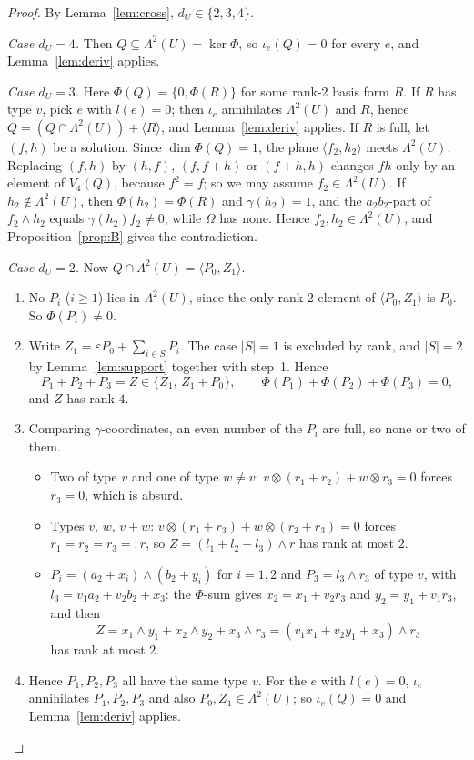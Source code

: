 \documentclass[11pt,a4paper]{article}
\theoremstyle{plain}
\theoremstyle{definition}
\theoremstyle{remark}
\newcommand{\Lam}{\Lambda^{2}}
\newcommand{\dU}{d_U}
\begin{document}
\begin{proof}
By Lemma~\ref{lem:cross}, $\dU\in\{2,3,4\}$.

\medskip\noindent\emph{Case $\dU=4$.} Then $Q\subseteq\Lam(U)=\ker\Phi$, so $\iota_e(Q)=0$ for every $e$, and Lemma~\ref{lem:deriv} applies.

\medskip\noindent\emph{Case $\dU=3$.} Here $\Phi(Q)=\{0,\Phi(R)\}$ for some rank-2 basis form $R$.
If $R$ has type $v$, pick $e$ with $l(e)=0$; then $\iota_e$ annihilates $\Lam(U)$ and $R$, hence $Q=(Q\cap\Lam(U))+\langle R\rangle$, and Lemma~\ref{lem:deriv} applies.
If $R$ is full, let $(f,h)$ be a solution. Since $\dim\Phi(Q)=1$, the plane $\langle f_2,h_2\rangle$ meets $\Lam(U)$. Replacing $(f,h)$ by $(h,f)$, $(f,f+h)$ or $(f+h,h)$ changes $fh$ only by an element of $V_4(Q)$, because $f^2=f$; so we may assume $f_2\in\Lam(U)$. If $h_2\notin\Lam(U)$, then $\Phi(h_2)=\Phi(R)$ and $\gamma(h_2)=1$, and the $a_2b_2$-part of $f_2\wedge h_2$ equals $\gamma(h_2)f_2\neq0$, while $\Omega$ has none. Hence $f_2,h_2\in\Lam(U)$, and Proposition~\ref{prop:B} gives the contradiction.

\medskip\noindent\emph{Case $\dU=2$.} Now $Q\cap\Lam(U)=\langle P_0,Z_1\rangle$.
\begin{enumerate}[1.]
  \item No $P_i$ ($i\ge1$) lies in $\Lam(U)$, since the only rank-2 element of $\langle P_0,Z_1\rangle$ is $P_0$. So $\Phi(P_i)\neq0$.
  \item Write $Z_1=\varepsilon P_0+\sum_{i\in S}P_i$. The case $|S|=1$ is excluded by rank, and $|S|=2$ by Lemma~\ref{lem:support} together with step~1. Hence
  \[
    P_1+P_2+P_3=Z\in\{Z_1,\,Z_1+P_0\},\qquad \Phi(P_1)+\Phi(P_2)+\Phi(P_3)=0,
  \]
  and $Z$ has rank $4$.
  \item Comparing $\gamma$-coordinates, an even number of the $P_i$ are full, so none or two of them.
  \begin{itemize}
    \item Two of type $v$ and one of type $w\neq v$: $v\otimes(r_1+r_2)+w\otimes r_3=0$ forces $r_3=0$, which is absurd.
    \item Types $v$, $w$, $v+w$: $v\otimes(r_1+r_3)+w\otimes(r_2+r_3)=0$ forces $r_1=r_2=r_3=:r$, so $Z=(l_1+l_2+l_3)\wedge r$ has rank at most $2$.
    \item $P_i=(a_2+x_i)\wedge(b_2+y_i)$ for $i=1,2$ and $P_3=l_3\wedge r_3$ of type $v$, with $l_3=v_1a_2+v_2b_2+x_3$: the $\Phi$-sum gives $x_2=x_1+v_2r_3$ and $y_2=y_1+v_1r_3$, and then
    \[
      Z=x_1\wedge y_1+x_2\wedge y_2+x_3\wedge r_3=(v_1x_1+v_2y_1+x_3)\wedge r_3
    \]
    has rank at most $2$.
  \end{itemize}
  \item Hence $P_1,P_2,P_3$ all have the same type $v$. For the $e$ with $l(e)=0$, $\iota_e$ annihilates $P_1,P_2,P_3$ and also $P_0,Z_1\in\Lam(U)$; so $\iota_e(Q)=0$ and Lemma~\ref{lem:deriv} applies.\qedhere
\end{enumerate}
\end{proof}
\end{document}
